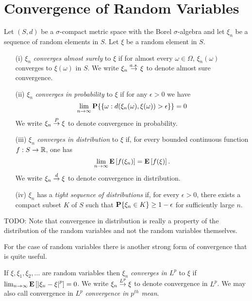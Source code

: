 \section{Convergence of Random Variables}
\begin{defn}Let $(S,d)$ be a $\sigma$-compact metric space with the Borel
  $\sigma$-algebra and let $\xi_n$ be a sequence of random elements in
  $S$.  Let $\xi$ be a random element in $S$.
\begin{itemize}
\item[(i)] $\xi_n$ \emph{converges almost surely} to $\xi$ if for almost
  every $\omega \in \Omega$, $\xi_n(\omega)$ converges to $\xi(\omega)$ in $S$.
We write $\xi_n \overset{a.s.}\to \xi$ to denote almost sure convergence.
\item[(ii)] $\xi_n$ \emph{converges in probability} to $\xi$ if for any
  $\epsilon>0$ we have 
\begin{equation*}
\lim_{n \to \infty} \textbf{P}\{ \lbrace \omega : d(\xi_n(\omega),
      \xi(\omega)) >
      \epsilon \rbrace \} = 0
\end{equation*}
We write $\xi_n \overset{P}\to \xi$ to denote convergence in probability.
\item[(iii)] $\xi_n$ \emph{converges in distribution} to $\xi$ if, for
  every bounded continuous function $f:S \to \mathbb{R}$, one has 
\begin{equation*}
\lim_{n \to \infty} \textbf{E}\left[f(\xi_n)\right] = \textbf{E}\left[f(\xi)\right].
\end{equation*} 
We write $\xi_n \overset{d}\to \xi$ to denote convergence in distribution.
\item[(iv)] $\xi_n$ has a \emph{tight sequence of distributions} if, for
  every $\epsilon>0$, there exists a compact subset $K$ of $S$ such
  that $\textbf{P}\{\xi_n \in K\} \geq 1 - \epsilon$ for sufficiently
  large $n$.
\end{itemize}
\end{defn}

TODO: Note that convergence in distribution is really a property of
the distribution of the random variables and not the random variables
themselves.

For the case of random variables there is another strong form of
convergence that is quite useful.
\begin{defn}If $\xi, \xi_1, \xi_2, \dots$ are random variables then $\xi_n$ \emph{converges in $L^p$} to $\xi$ if 
$\lim_{n \to \infty} \textbf{E}\left[\left \vert \xi_n - \xi \right \vert^p\right] = 0$.
We write $\xi_n \overset{L^p}\to \xi$ to denote convergence in $L^p$.  We may
also call convergence in $L^p$ \emph{convergence in $p^{th}$ mean}.
\end{defn}

